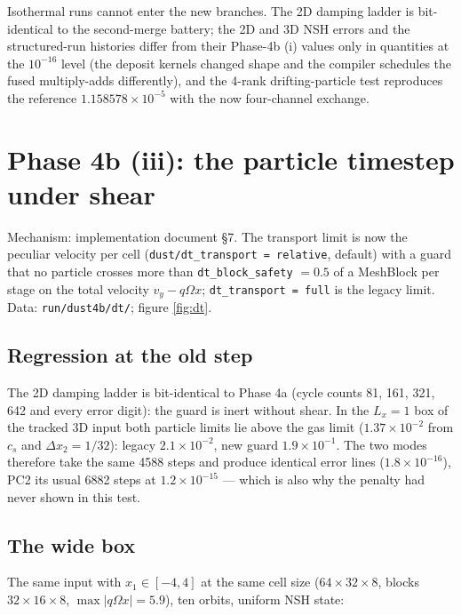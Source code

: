 \documentclass[11pt]{article}
\newcommand{\code}[1]{\texttt{#1}}
\newcommand{\file}[1]{\texttt{#1}}
\newcommand{\Om}{\Omega}
\begin{document}
Isothermal runs cannot enter the new branches. The 2D damping ladder is bit-identical
to the second-merge battery; the 2D and 3D NSH errors and the structured-run
histories differ from their Phase-4b (i) values only in quantities at the $10^{-16}$
level (the deposit kernels changed shape and the compiler schedules the fused
multiply-adds differently), and the 4-rank drifting-particle test reproduces the
reference $1.158578\times10^{-5}$ with the now four-channel exchange.

\section{Phase 4b (iii): the particle timestep under shear}
\label{sec:phase4b3}

Mechanism: implementation document \S7. The transport limit is now the peculiar
velocity per cell (\code{dust/dt\_transport = relative}, default) with a guard that no
particle crosses more than \code{dt\_block\_safety} $= 0.5$ of a MeshBlock per stage on
the total velocity $v_y - q\Om x$; \code{dt\_transport = full} is the legacy limit. Data:
\file{run/dust4b/dt/}; figure \ref{fig:dt}.

\subsection{Regression at the old step}

The 2D damping ladder is bit-identical to Phase 4a (cycle counts 81, 161, 321, 642 and
every error digit): the guard is inert without shear. In the $L_x = 1$ box of the
tracked 3D input both particle limits lie above the gas limit
($1.37\times10^{-2}$ from $c_s$ and $\Delta x_2 = 1/32$): legacy $2.1\times10^{-2}$,
new guard $1.9\times10^{-1}$. The two modes therefore take the same 4588 steps and
produce identical error lines ($1.8\times10^{-16}$), PC2 its usual 6882 steps at
$1.2\times10^{-15}$ --- which is also why the penalty had never shown in this test.

\subsection{The wide box}

The same input with $x_1 \in [-4,4]$ at the same cell size ($64\times32\times8$,
blocks $32\times16\times8$, $\max|q\Om x| = 5.9$), ten orbits, uniform NSH state:
\end{document}
